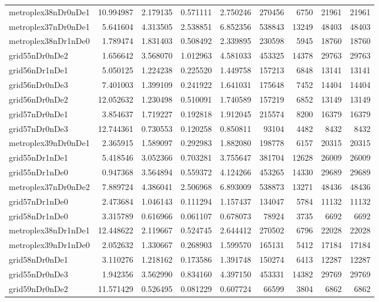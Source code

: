 \begin{longtable}{|l|r|r|r|r|r|r|r|r|}
metroplex38nDr0nDe1 & 10.994987 & 2.179135 & 0.571111 & 2.750246 & 270456 & 6750 & 21961 & 21961 \\
metroplex37nDr0nDe1 & 5.641604 & 4.313505 & 2.538851 & 6.852356 & 538843 & 13249 & 48403 & 48403 \\
metroplex38nDr1nDe0 & 1.789474 & 1.831403 & 0.508492 & 2.339895 & 230598 & 5945 & 18760 & 18760 \\
grid55nDr0nDe2 & 1.656642 & 3.568070 & 1.012963 & 4.581033 & 453325 & 14378 & 29763 & 29763 \\
grid56nDr1nDe1 & 5.050125 & 1.224238 & 0.225520 & 1.449758 & 157213 & 6848 & 13141 & 13141 \\
grid56nDr0nDe3 & 7.401003 & 1.399109 & 0.241922 & 1.641031 & 175648 & 7452 & 14404 & 14404 \\
grid56nDr0nDe2 & 12.052632 & 1.230498 & 0.510091 & 1.740589 & 157219 & 6852 & 13149 & 13149 \\
grid57nDr0nDe1 & 3.854637 & 1.719227 & 0.192818 & 1.912045 & 215574 & 8200 & 16379 & 16379 \\
grid57nDr0nDe3 & 12.744361 & 0.730553 & 0.120258 & 0.850811 & 93104 & 4482 & 8432 & 8432 \\
metroplex39nDr0nDe1 & 2.365915 & 1.589097 & 0.292983 & 1.882080 & 198778 & 6157 & 20315 & 20315 \\
grid55nDr1nDe1 & 5.418546 & 3.052366 & 0.703281 & 3.755647 & 381704 & 12628 & 26009 & 26009 \\
grid55nDr1nDe0 & 0.947368 & 3.564894 & 0.559372 & 4.124266 & 453265 & 14330 & 29689 & 29689 \\
metroplex37nDr0nDe2 & 7.889724 & 4.386041 & 2.506968 & 6.893009 & 538873 & 13271 & 48436 & 48436 \\
grid57nDr1nDe0 & 2.473684 & 1.046143 & 0.111294 & 1.157437 & 134047 & 5784 & 11132 & 11132 \\
grid58nDr1nDe0 & 3.315789 & 0.616966 & 0.061107 & 0.678073 & 78924 & 3735 & 6692 & 6692 \\
metroplex38nDr1nDe1 & 12.448622 & 2.119667 & 0.524745 & 2.644412 & 270502 & 6796 & 22028 & 22028 \\
metroplex39nDr1nDe0 & 2.052632 & 1.330667 & 0.268903 & 1.599570 & 165131 & 5412 & 17184 & 17184 \\
grid58nDr0nDe1 & 3.110276 & 1.218162 & 0.173586 & 1.391748 & 150274 & 6413 & 12287 & 12287 \\
grid55nDr0nDe3 & 1.942356 & 3.562990 & 0.834160 & 4.397150 & 453331 & 14382 & 29769 & 29769 \\
grid59nDr0nDe2 & 11.571429 & 0.526495 & 0.081229 & 0.607724 & 66599 & 3804 & 6862 & 6862 \\

\end{longtable}
